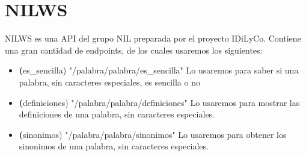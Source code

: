 \section{NILWS}\label{sec:nilws}
NILWS es una API del grupo NIL preparada por el proyecto IDiLyCo.
Contiene una gran cantidad de endpoints, de los cuales usaremos los siguientes:
\begin{itemize}
	\item \textbf(es\_sencilla) "/palabra/{palabra}/es\_sencilla" 
	Lo usaremos para saber si una palabra, sin caracteres especiales, es sencilla o no
	\item \textbf(definiciones) "/palabra/{palabra}/definiciones"
	Lo usaremos para mostrar las definiciones de una palabra, sin caracteres especiales.
	\item \textbf(sinonimos) "/palabra/{palabra}/sinonimos" 
	Lo usaremos para obtener los sinonimos de una palabra, sin caracteres especiales.
\end{itemize}